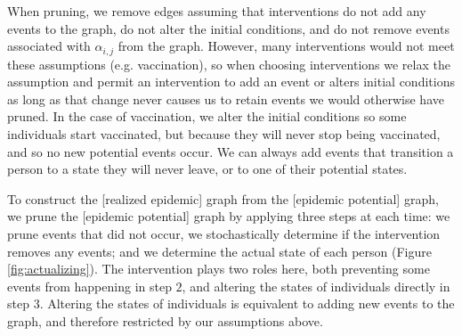 \documentclass[PTRSB]{rsos}
\begin{document}
\begin{multicols}{2}
When pruning, we remove edges assuming that interventions do not add any events to the graph, do not alter the initial conditions, and do not remove events associated with $\alpha_{i,j}$ from the graph.
However, many interventions would not meet these assumptions (e.g. vaccination), so when choosing interventions we relax the assumption and permit an intervention to add an event or alters initial conditions as long as that change never causes us to retain events we would otherwise have pruned.
In the case of vaccination, we alter the initial conditions so some individuals start vaccinated, but because they will never stop being vaccinated, and so no new potential events occur.
We can always add events that transition a person to a state they will never leave, or to one of their potential states.

To construct the [realized epidemic] graph from the [epidemic potential] graph, we prune the [epidemic potential] graph by applying three steps at each time: we prune events that did not occur, we stochastically determine if the intervention removes any events; and we determine the actual state of each person (Figure \ref{fig:actualizing}).
The intervention plays two roles here, both preventing some events from happening in step $2$, and altering the states of individuals directly in step $3$.
Altering the states of individuals is equivalent to adding new events to the graph, and therefore restricted by our assumptions above.


\end{multicols}
\end{document}
